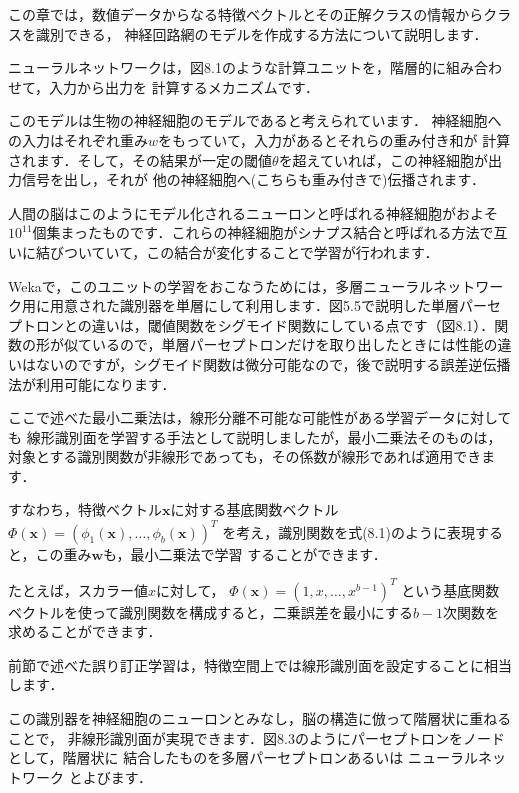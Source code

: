

この章では，数値データからなる特徴ベクトルとその正解クラスの情報からクラスを識別できる，
神経回路網のモデルを作成する方法について説明します．

ニューラルネットワークは，図8.1のような計算ユニットを，階層的に組み合わせて，入力から出力を
計算するメカニズムです．


このモデルは生物の神経細胞のモデルであると考えられています．
神経細胞への入力はそれぞれ重み$w$をもっていて，入力があるとそれらの重み付き和が
計算されます．そして，その結果が一定の閾値$\theta$を超えていれば，この神経細胞が出力信号を出し，それが
他の神経細胞へ(こちらも重み付きで)伝播されます．

人間の脳はこのようにモデル化されるニューロンと呼ばれる神経細胞がおよそ$10^{11}$個集まったものです．これらの神経細胞がシナプス結合と呼ばれる方法で互いに結びついていて，この結合が変化することで学習が行われます．


Wekaで，このユニットの学習をおこなうためには，多層ニューラルネットワーク用に用意された識別器を単層にして利用します．図5.5で説明した単層パーセプトロンとの違いは，閾値関数をシグモイド関数にしている点です（図8.1）．関数の形が似ているので，単層パーセプトロンだけを取り出したときには性能の違いはないのですが，シグモイド関数は微分可能なので，後で説明する誤差逆伝播法が利用可能になります．

ここで述べた最小二乗法は，線形分離不可能な可能性がある学習データに対しても
線形識別面を学習する手法として説明しましたが，最小二乗法そのものは，
対象とする識別関数が非線形であっても，その係数が線形であれば適用できます．

すなわち，特徴ベクトル$\bm{x}$に対する基底関数ベクトル
$\Phi(\bm{x})=(\phi_1(\bm{x}),\dots,\phi_b(\bm{x}))^T$
を考え，識別関数を式(8.1)のように表現すると，この重み$\bm{w}$も，最小二乗法で学習
することができます．


たとえば，スカラー値$x$に対して，
$\Phi(\bm{x})=(1, x,\dots ,x^{b-1})^T$
という基底関数ベクトルを使って識別関数を構成すると，二乗誤差を最小にする$b-1$次関数を
求めることができます．


前節で述べた誤り訂正学習は，特徴空間上では線形識別面を設定することに相当します．

この識別器を神経細胞のニューロンとみなし，脳の構造に倣って階層状に重ねることで，
非線形識別面が実現できます．図8.3のようにパーセプトロンをノードとして，階層状に
結合したものを多層パーセプトロンあるいは
ニューラルネットワーク
とよびます．

